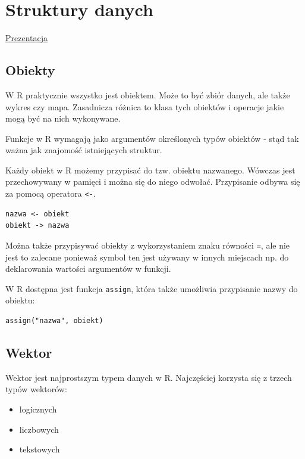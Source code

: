 \documentclass[
  letterpaper,
  DIV=11,
  numbers=noendperiod]{scrreprt}
\providecommand{\tightlist}{%
  \setlength{\itemsep}{0pt}\setlength{\parskip}{0pt}}\usepackage{longtable,booktabs,array}
\begin{document}

\hypertarget{struktury-danych}{%
\chapter{Struktury danych}\label{struktury-danych}}

\href{presentations/01a_typy_danych.html}{Prezentacja}

\hypertarget{obiekty}{%
\section{Obiekty}\label{obiekty}}

W R praktycznie wszystko jest obiektem. Może to być zbiór danych, ale
także wykres czy mapa. Zasadnicza różnica to klasa tych obiektów i
operacje jakie mogą być na nich wykonywane.

Funkcje w R wymagają jako argumentów określonych typów obiektów - stąd
tak ważna jak znajomość istniejących struktur.

Każdy obiekt w R możemy przypisać do tzw. obiektu nazwanego. Wówczas
jest przechowywany w pamięci i można się do niego odwołać. Przypisanie
odbywa się za pomocą operatora \texttt{\textless{}-}.

\begin{verbatim}
nazwa <- obiekt
obiekt -> nazwa
\end{verbatim}

Można także przypisywać obiekty z wykorzystaniem znaku równości
\texttt{=}, ale nie jest to zalecane ponieważ symbol ten jest używany w
innych miejscach np. do deklarowania wartości argumentów w funkcji.

W R dostępna jest funkcja \texttt{assign}, która także umożliwia
przypisanie nazwy do obiektu:

\begin{verbatim}
assign("nazwa", obiekt)
\end{verbatim}

\hypertarget{wektor}{%
\section{Wektor}\label{wektor}}

Wektor jest najprostszym typem danych w R. Najczęściej korzysta się z
trzech typów wektorów:

\begin{itemize}
\tightlist
\item
  logicznych
\item
  liczbowych
\item
  tekstowych
\end{itemize}
\end{document}
